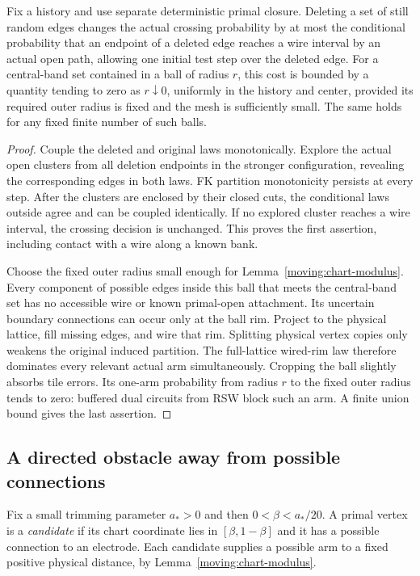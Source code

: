 \begin{lemma}\label{moving:deletion}
Fix a history and use separate deterministic primal closure.
Deleting a set of still random edges changes the actual crossing
probability by at most the conditional probability that an endpoint
of a deleted edge reaches a wire interval by an actual open path,
allowing one initial test step over the deleted edge.
For a central-band set contained in a ball of radius $r$, this cost
is bounded by a quantity tending to zero as $r\downarrow0$,
uniformly in the history and center, provided its required outer
radius is fixed and the mesh is sufficiently small.  The same holds
for any fixed finite number of such balls.
\end{lemma}
\begin{proof}
Couple the deleted and original laws monotonically.  Explore the
actual open clusters from all deletion endpoints in the stronger
configuration, revealing the corresponding edges in both laws.
FK partition monotonicity persists at every step.  After the clusters
are enclosed by their closed cuts, the conditional laws outside
agree and can be coupled identically.  If no explored cluster reaches
a wire interval, the crossing decision is unchanged.  This proves
the first assertion, including contact with a wire along a known bank.

Choose the fixed outer radius small enough for
Lemma~\ref{moving:chart-modulus}.  Every component of possible edges
inside this ball that meets the central-band set has no accessible
wire or known primal-open attachment.  Its uncertain boundary
connections can occur only at the ball rim.  Project to the physical
lattice, fill missing edges, and wire that rim.  Splitting physical
vertex copies only weakens the original induced partition.  The
full-lattice wired-rim law therefore dominates every relevant actual
arm simultaneously.  Cropping the ball slightly absorbs tile errors.
Its one-arm probability from radius $r$ to the fixed outer radius
tends to zero: buffered dual circuits from RSW block such an arm.
A finite union bound gives the last assertion.
\end{proof}

\subsection{A directed obstacle away from possible connections}

Fix a small trimming parameter $a_*>0$ and then
$0<\beta<a_*/20$.  A primal vertex is a \emph{candidate} if its chart
coordinate lies in $[\beta,1-\beta]$ and it has a possible connection
to an electrode.  Each candidate supplies a possible arm to a fixed
positive physical distance, by Lemma~\ref{moving:chart-modulus}.

